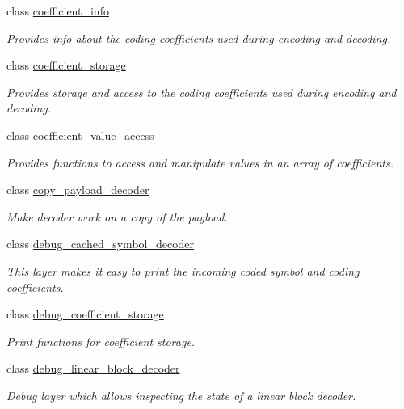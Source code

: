 \begin{DoxyCompactItemize}
class \hyperlink{classkodo_1_1coefficient__info}{coefficient\-\_\-info}
\begin{DoxyCompactList}\small\item\em Provides info about the coding coefficients used during encoding and decoding. \end{DoxyCompactList}\item 
class \hyperlink{classkodo_1_1coefficient__storage}{coefficient\-\_\-storage}
\begin{DoxyCompactList}\small\item\em Provides storage and access to the coding coefficients used during encoding and decoding. \end{DoxyCompactList}\item 
class \hyperlink{classkodo_1_1coefficient__value__access}{coefficient\-\_\-value\-\_\-access}
\begin{DoxyCompactList}\small\item\em Provides functions to access and manipulate values in an array of coefficients. \end{DoxyCompactList}\item 
class \hyperlink{classkodo_1_1copy__payload__decoder}{copy\-\_\-payload\-\_\-decoder}
\begin{DoxyCompactList}\small\item\em Make decoder work on a copy of the payload. \end{DoxyCompactList}\item 
class \hyperlink{classkodo_1_1debug__cached__symbol__decoder}{debug\-\_\-cached\-\_\-symbol\-\_\-decoder}
\begin{DoxyCompactList}\small\item\em This layer makes it easy to print the incoming coded symbol and coding coefficients. \end{DoxyCompactList}\item 
class \hyperlink{classkodo_1_1debug__coefficient__storage}{debug\-\_\-coefficient\-\_\-storage}
\begin{DoxyCompactList}\small\item\em Print functions for coefficient storage. \end{DoxyCompactList}\item 
class \hyperlink{classkodo_1_1debug__linear__block__decoder}{debug\-\_\-linear\-\_\-block\-\_\-decoder}
\begin{DoxyCompactList}\small\item\em Debug layer which allows inspecting the state of a linear block decoder. \end{DoxyCompactList}\item 

\end{DoxyCompactItemize}
